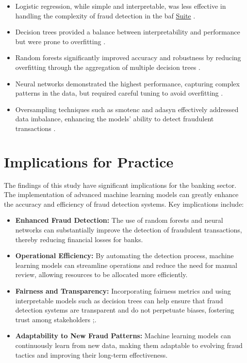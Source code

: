 \documentclass[12pt,a4paper]{report}
\begin{document}
\begin{itemize}
    \item Logistic regression, while simple and interpretable, was less effective in handling the complexity of fraud detection in the \acrshort{baf} \href{https://www.kaggle.com/datasets/sgpjesus/bank-account-fraud-dataset-neurips-2022/code}{Suite} \citep{bao2020detecting}.
    \item Decision trees provided a balance between interpretability and performance but were prone to overfitting \citep{pan2024machine}.
    \item Random forests significantly improved accuracy and robustness by reducing overfitting through the aggregation of multiple decision trees \citep{seera2024intelligent}.
    \item Neural networks demonstrated the highest performance, capturing complex patterns in the data, but required careful tuning to avoid overfitting \citep{chawla2002smote}.
    \item Oversampling techniques such as \acrshort{smotenc} and \acrshort{adasyn} effectively addressed data imbalance, enhancing the models' ability to detect fraudulent transactions \citep{he2008adasyn}.
\end{itemize}

\section{Implications for Practice}
The findings of this study have significant implications for the banking sector. The implementation of advanced machine learning models can greatly enhance the accuracy and efficiency of fraud detection systems. Key implications include:

\begin{itemize}
    \item \textbf{Enhanced Fraud Detection:} The use of random forests and neural networks can substantially improve the detection of fraudulent transactions, thereby reducing financial losses for banks.
    \item \textbf{Operational Efficiency:} By automating the detection process, machine learning models can streamline operations and reduce the need for manual review, allowing resources to be allocated more efficiently.
    \item \textbf{Fairness and Transparency:} Incorporating fairness metrics and using interpretable models such as decision trees can help ensure that fraud detection systems are transparent and do not perpetuate biases, fostering trust among stakeholders \citep{barocas2023fairness};\citep{mehrabi2021survey}.
    \item \textbf{Adaptability to New Fraud Patterns:} Machine learning models can continuously learn from new data, making them adaptable to evolving fraud tactics and improving their long-term effectiveness.
\end{itemize}
\end{document}
